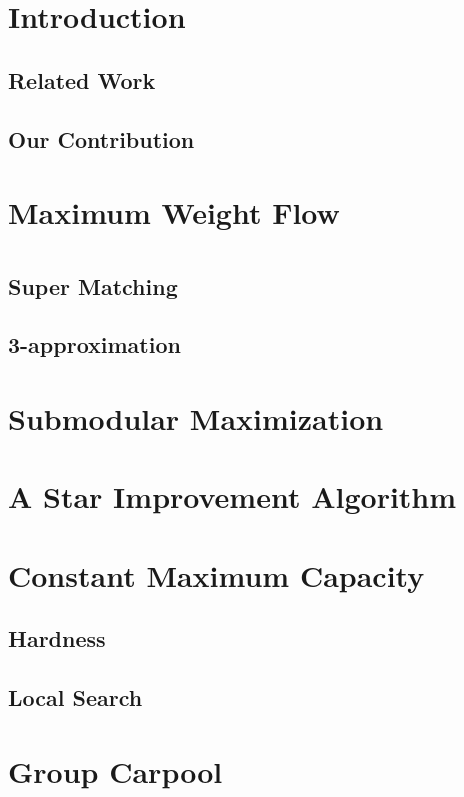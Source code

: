 \section{Introduction}
	\subsection{Related Work}
	
	\subsection{Our Contribution}

\section{Maximum Weight Flow}

\section{\FIXEDCARPOOL{}}

\section{\UWCARPOOL{}}

\section{\CARPOOL{}}
\label{sec:cm}
	\subsection{Super Matching}
	\subsection{3-approximation}
	
\section{Submodular Maximization}
\label{sec:sub}
 
\section{A Star Improvement Algorithm}
\label{sec:improve}
	
\section{Constant Maximum Capacity}
\label{sec:cmax}
   \subsection{Hardness}
   \label{sec:hardness}

   \subsection{Local Search}
   \label{sec:local}

\section{Group Carpool}
\label{sec:group}

